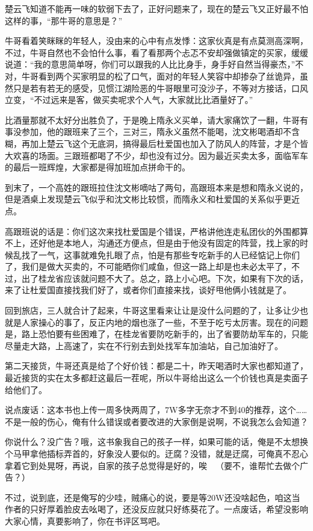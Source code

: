 楚云飞知道不能再一味的软弱下去了，正好问题来了，现在的楚云飞又正好最不怕这样的事，“那牛哥的意思是？”

牛哥看着笑眯眯的年轻人，没由来的心中有点发悸：这家伙真是有点莫测高深啊，不过，牛哥自然也不会怕什么事，看了看那两个忐忑不安却强做镇定的买家，缓缓说道：“我的意思简单呀，你们可以跟我的人比比身手，身手好自然当得豪杰，”不对，牛哥看到两个买家明显的松了口气，面对的年轻人笑容中却掺杂了丝诡异，虽然只是若有若无的感受，见惯江湖险恶的牛哥眼里可没沙子，不等对方接话，口风立变，“不过远来是客，做买卖呢求个人气，大家就比比酒量好了。”

比酒量那就不太好分出胜负了，于是晚上隋永义买单，请大家痛饮了一翻，牛哥有事没参加，他的跟班来了三个，三对三，隋永义虽然不能喝，沈文彬喝酒却不含糊，再加上楚云飞这个无底洞，搞得最后杜爱国也加入了防风人的阵营，才是个皆大欢喜的场面。三跟班都喝了不少，却也没有过分。因为最近买卖太多，面临军车的最后一班辉煌，大家都是得加班加点拼命干的。

到末了，一个高姓的跟班拉住沈文彬嘀咕了两句，高跟班本来是想和隋永义说的，但是酒桌上发现楚云飞似乎和沈文彬比较惯，而隋永义和杜爱国的关系似乎更近点。

高跟班说的话是：你们这次来找杜爱国是个错误，严格讲他连走私团伙的外围都算不上，还好他是本地人，沟通还方便点，但是由于他没有固定的阵营，找上家的时候乱找了一气，这事就难免扎眼了点，怕是有那些专吃新手的人已经惦记上你们了，我们是做大买卖的，不可能晒你们咸鱼，但这一路上却是也未必太平了，不过，出了桂龙省应该就问题不大了。总之，路上小心吧。下次，如果有下次的话，来了让杜爱国直接找我们好了，或者你们直接来找，谈好甩他俩小钱就是了。

回到旅店，三人就合计了起来，牛哥这里看来让让是没什么问题的了，让多让少也就是人家操心的事了，反正内地的烟也涨了一些，不至于吃亏太厉害。现在的问题是，路上恐怕要有些困难了，在桂龙省要防吃新手的，出了省要防劫军车的，只能尽量走大路，上高速了，实在不行别去到处找军车加油站，自己加油好了。

第二天接货，牛哥还真是给了个好价钱：都是二十，昨天喝酒时大家也都知道了，最近接货的实在太多都赶这最后一茬呢，所以牛哥给出这么一个价钱也真是卖面子给他们了。

说点废话：这本书也上传一周多快两周了，7W多字无奈才不到40的推荐，这个……不是一般的伤心，俺有什么错误或者要改进的大家倒是说啊，不说我怎么会知道？

你说什么？没广告？哦，这书象我自己的孩子一样，如果可能的话，俺是不太想换个马甲拿他插标弄首的，好象没人要似的。迂腐？没错，就是迂腐，可俺真不忍心拿着它到处晃呀，再说，自家的孩子总觉得是好的，唉~~（要不，谁帮忙去做个广告？）

不过，说到底，还是俺写的少哇，贼痛心的说，要是等20W还没啥起色，咱这当作者的只好厚着脸皮去吆喝了，还没反应就只好练葵花了。一点废话，希望没影响大家心情，真要影响了，你在书评区骂吧。

